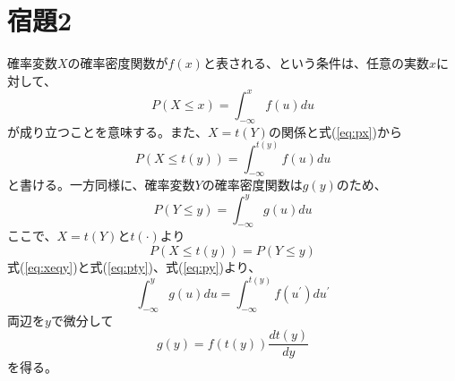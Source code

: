 \documentclass[10pt,a4paper]{ltjsarticle}       %
\begin{document}
\section{宿題2}
確率変数$X$の確率密度関数が$f(x)$と表される、という条件は、任意の実数$x$に対して、
\begin{equation}
P(X\le x) = \int_{-\infty}^{x} f(u)du
\label{eq:px}
\end{equation}
が成り立つことを意味する。また、$X=t(Y)$の関係と式(\ref{eq:px})から
\begin{equation}
P(X\le t(y)) = \int_{-\infty}^{t(y)} f(u) du
\label{eq:pty}
\end{equation}
と書ける。一方同様に、確率変数$Y$の確率密度関数は$g(y)$のため、
\begin{equation}
P(Y \le y) = \int_{-\infty}^{y} g(u) du
\label{eq:py}
\end{equation}
ここで、$X=t(Y)$と$t(\cdot)$より
\begin{equation}
P(X \le t(y)) = P(Y \le y)
\label{eq:xeqy}
\end{equation}
式(\ref{eq:xeqy})と式(\ref{eq:pty})、式(\ref{eq:py})より、
\begin{equation}
\int_{-\infty}^{y} g(u) du = \int_{-\infty}^{t(y)} f(u^{\prime}) du^{\prime}
\end{equation}
両辺を$y$で微分して
\begin{equation}
g(y) = f(t(y))\frac{dt(y)}{dy}
\end{equation}
を得る。
\end{document}
